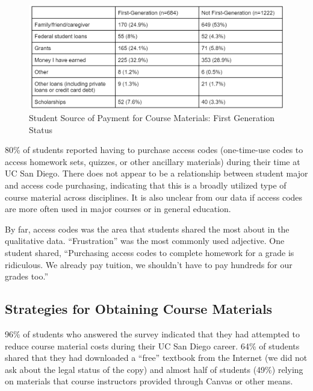 \documentclass[
  letterpaper,
  DIV=11,
  numbers=noendperiod]{scrreprt}
\begin{document}
\begin{figure}

{\centering \includegraphics{./viz/alfs/AOCM_student_spending_1g.png}

}

\caption{Student Source of Payment for Course Materials: First
Generation Status}

\end{figure}

80\% of students reported having to purchase access codes (one-time-use
codes to access homework sets, quizzes, or other ancillary materials)
during their time at UC San Diego. There does not appear to be a
relationship between student major and access code purchasing,
indicating that this is a broadly utilized type of course material
across disciplines. It is also unclear from our data if access codes are
more often used in major courses or in general education.

By far, access codes was the area that students shared the most about in
the qualitative data. ``Frustration'' was the most commonly used
adjective. One student shared, ``Purchasing access codes to complete
homework for a grade is ridiculous. We already pay tuition, we shouldn't
have to pay hundreds for our grades too.''

\hypertarget{strategies-for-obtaining-course-materials}{%
\subsection{Strategies for Obtaining Course
Materials}\label{strategies-for-obtaining-course-materials}}

96\% of students who answered the survey indicated that they had
attempted to reduce course material costs during their UC San Diego
career. 64\% of students shared that they had downloaded a ``free''
textbook from the Internet (we did not ask about the legal status of the
copy) and almost half of students (49\%) relying on materials that
course instructors provided through Canvas or other means.
\end{document}
